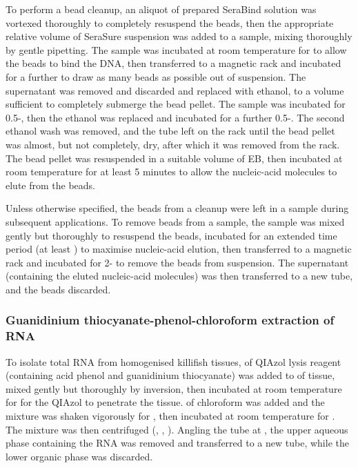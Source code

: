 To perform a bead cleanup, an aliquot of prepared SeraBind solution was vortexed thoroughly to completely resuspend the beads, then the appropriate relative volume of SeraSure suspension was added to a sample, mixing thoroughly by gentle pipetting. The sample was incubated at room temperature for  to allow the beads to bind the DNA, then transferred to a magnetic rack and incubated for a further  to draw as many beads as possible out of suspension. The supernatant was removed and discarded and replaced with  ethanol, to a volume sufficient to completely submerge the bead pellet. The sample was incubated for 0.5-, then the ethanol was replaced and incubated for a further 0.5-. The second ethanol wash was removed, and the tube left on the rack until the bead pellet was almost, but not completely, dry, after which it was removed from the rack. The bead pellet was resuspended in a suitable volume of EB, then incubated at room temperature for at least 5 minutes to allow the nucleic-acid molecules to elute from the beads.

Unless otherwise specified, the beads from a cleanup were left in a sample during subsequent applications. To remove beads from a sample, the sample was mixed gently but thoroughly to resuspend the beads, incubated for an extended time period (at least ) to maximise nucleic-acid elution, then transferred to a magnetic rack and incubated for 2- to remove the beads from suspension. The supernatant (containing the eluted nucleic-acid molecules) was then transferred to a new tube, and the beads discarded.

\subsubsection{Guanidinium thiocyanate-phenol-chloroform extraction of RNA}
\label{sec:methods_molec_standard_qiazol}

To isolate total RNA from homogenised killifish tissues,  of QIAzol lysis reagent (containing acid phenol and guanidinium thiocyanate) was added to  of tissue, mixed gently but thoroughly by inversion, then incubated at room temperature for  for the QIAzol to penetrate the tissue.  of chloroform was added and the mixture was shaken vigorously for , then incubated at room temperature for . The mixture was then centrifuged (, , ). Angling the tube at , the upper aqueous phase containing the RNA was removed and transferred to a new tube, while the lower organic phase was discarded.

